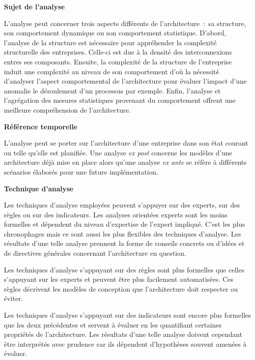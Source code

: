 	\begin{description}
	\item \textbf{Sujet de l'analyse} 

L'analyse peut concerner trois aspects différents de l'architecture~:~sa structure, son comportement dynamique ou son comportement statistique. D'abord, l'analyse de la structure est nécessaire pour appréhender la complexité structurelle des entreprises. Celle-ci est due à la densité des interconnexions entres ses composants. Ensuite, la complexité de la structure de l'entreprise induit une complexité au niveau de son comportement d'où la nécessité d'analyser l'aspect comportemental de l'architecture pour évaluer l'impact d'une anomalie le déroulement d'un processus par exemple. Enfin, l'analyse et l'agrégation des mesures statistiques provenant du comportement offrent une meilleure compréhension de l'architecture.

	\item \textbf{Référence temporelle}

L'analyse peut se porter sur l'architecture d'une entreprise dans son état courant ou telle qu'elle est planifiée. Une analyse \textit{ex post} concerne les modèles d'une architecture déjà mise en place alors qu'une analyse \textit{ex ante} se réfère à différents scénarios élaborés pour une future implémentation.

	\item \textbf{Technique d'analyse}

Les techniques d'analyse employées peuvent s'appuyer sur des experts, sur des règles ou sur des indicateurs. Les analyses orientées experts sont les moins formelles et dépendent du niveau d'expertise de l'expert impliqué. C'est les plus chronophages mais ce sont aussi les plus flexibles des techniques d'analyse. Les résultats d'une telle analyse prennent la forme de conseils concrets ou d'idées et de directives générales concernant l'architecture en question.

Les techniques d'analyse s'appuyant sur des règles sont plus formelles que celles s'appuyant sur les experts et peuvent être plus facilement automatisées. Ces règles décrivent les modèles de conception que l'architecture doit respecter ou éviter. 

Les techniques d'analyse s'appuyant sur des indicateurs sont encore plus formelles que les deux précédentes et servent à évaluer en les quantifiant certaines propriétés de l'architecture. Les résultats d'une telle analyse doivent cependant être interprétés avec prudence car ils dépendent d'hypothèses souvent amenées à évoluer.


\end{description}
